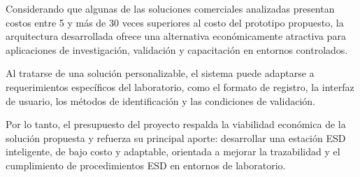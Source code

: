 Considerando que algunas de las soluciones comerciales analizadas presentan costos 
entre 5 y más de 30 veces superiores al costo del prototipo propuesto, la arquitectura 
desarrollada ofrece una alternativa económicamente atractiva para aplicaciones de investigación, 
validación y capacitación en entornos controlados.


Al tratarse de una solución personalizable, el
sistema puede adaptarse a requerimientos específicos del laboratorio, como el formato de
registro, la interfaz de usuario, los métodos de identificación y las condiciones de validación.

Por lo tanto, el presupuesto del proyecto respalda la viabilidad económica de la solución
propuesta y refuerza su principal aporte: desarrollar una estación ESD inteligente, de bajo
costo y adaptable, orientada a mejorar la trazabilidad y el cumplimiento de procedimientos
ESD en entornos de laboratorio.

